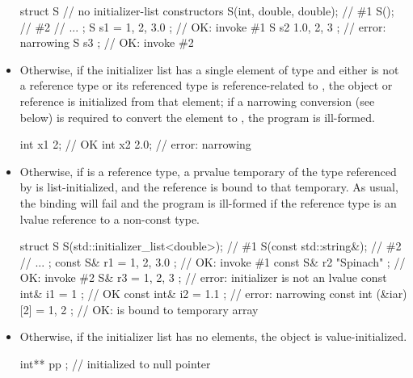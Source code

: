 \begin{itemize}
\enterexample
\begin{codeblock}
struct S {
  // no initializer-list constructors
  S(int, double, double);           // \#1
  S();                              // \#2
  // ...
};
S s1 = { 1, 2, 3.0 };               // OK: invoke \#1
S s2 { 1.0, 2, 3 };                 // error: narrowing
S s3 { };                           // OK: invoke \#2
\end{codeblock}
\exitexample

\item Otherwise, if
the initializer list has a single element of type  and either
 is not a reference type or its referenced type is
reference-related to , the object or reference is initialized
from that element; if a narrowing conversion (see below) is required
to convert the element to , the program is ill-formed.

\enterexample
\begin{codeblock}
int x1 {2};                         // OK
int x2 {2.0};                       // error: narrowing
\end{codeblock}
\exitexample

\item Otherwise, if  is a reference type, a prvalue temporary of the type
referenced by  is list-initialized, and the reference is bound to that
temporary. \enternote As usual, the binding will fail and the program is ill-formed if
the reference type is an lvalue reference to a non-const type. \exitnote

\enterexample
\begin{codeblock}
struct S {
  S(std::initializer_list<double>); // \#1
  S(const std::string&);            // \#2
  // ...
};
const S& r1 = { 1, 2, 3.0 };        // OK: invoke \#1
const S& r2 { "Spinach" };          // OK: invoke \#2
S& r3 = { 1, 2, 3 };                // error: initializer is not an lvalue
const int& i1 = { 1 };              // OK
const int& i2 = { 1.1 };            // error: narrowing
const int (&iar)[2] = { 1, 2 };     // OK:  is bound to temporary array
\end{codeblock}
\exitexample

\item Otherwise, if the initializer list has no elements, the object is
value-initialized.

\enterexample
\begin{codeblock}
int** pp {};                        // initialized to null pointer
\end{codeblock}
\exitexample


\end{itemize}
